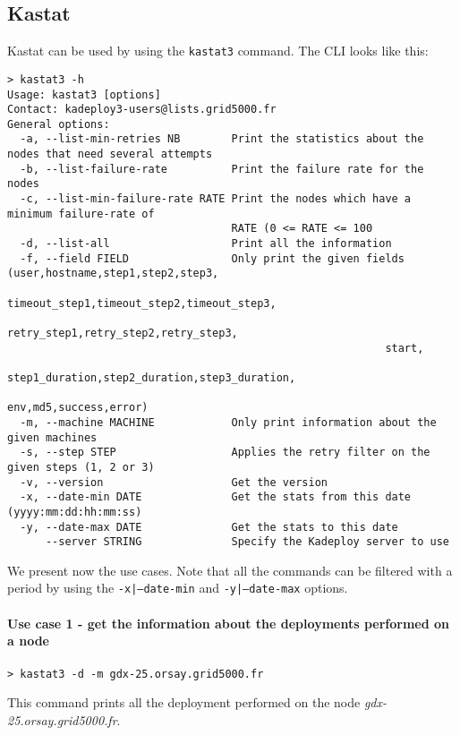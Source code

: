 \documentclass[a4wide,10pt,oneside]{book}
\begin{document}
\subsection{Kastat}\label{sec:kastat}
Kastat can be used by using the \texttt{kastat3} command. The CLI looks like this:
\begin{small}
\begin{verbatim}
> kastat3 -h
Usage: kastat3 [options]
Contact: kadeploy3-users@lists.grid5000.fr
General options:
  -a, --list-min-retries NB        Print the statistics about the nodes that need several attempts
  -b, --list-failure-rate          Print the failure rate for the nodes
  -c, --list-min-failure-rate RATE Print the nodes which have a minimum failure-rate of 
                                   RATE (0 <= RATE <= 100
  -d, --list-all                   Print all the information
  -f, --field FIELD                Only print the given fields (user,hostname,step1,step2,step3,
                                                           timeout_step1,timeout_step2,timeout_step3,
                                                           retry_step1,retry_step2,retry_step3,
                                                           start,
                                                           step1_duration,step2_duration,step3_duration,
                                                           env,md5,success,error)
  -m, --machine MACHINE            Only print information about the given machines
  -s, --step STEP                  Applies the retry filter on the given steps (1, 2 or 3)
  -v, --version                    Get the version
  -x, --date-min DATE              Get the stats from this date (yyyy:mm:dd:hh:mm:ss)
  -y, --date-max DATE              Get the stats to this date
      --server STRING              Specify the Kadeploy server to use
\end{verbatim}
\end{small}

We present now the use cases. Note that all the commands can be filtered with a period by using the \texttt{-x|--date-min} and \texttt{-y|--date-max} options.
\paragraph{Use case 1 - get the information about the deployments performed on a node}
\begin{verbatim}
> kastat3 -d -m gdx-25.orsay.grid5000.fr
\end{verbatim}
This command prints all the deployment performed on the node \textit{gdx-25.orsay.grid5000.fr}.
\end{document}
